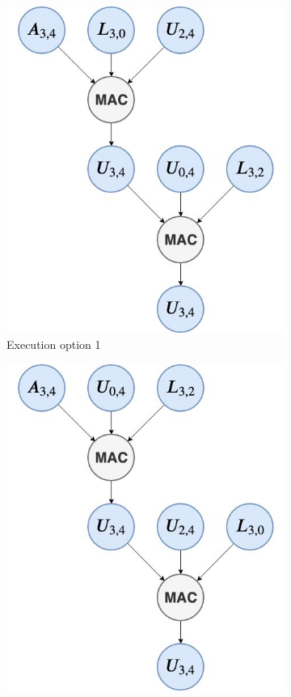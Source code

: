 \begin{figure}
\begin{subfigure}[t]{0.32\textwidth}
        \includegraphics[width = \textwidth]{./Scheduler/macNode1.jpg}
        \caption{Execution option 1}
        \label{fig:sym:example:mac1}
    \end{subfigure}
    \hfill
    \begin{subfigure}[t]{0.32\textwidth}
        \centering
        \includegraphics[width = \textwidth]{./Scheduler/macNode2.jpg}

\end{subfigure}
\end{figure}
